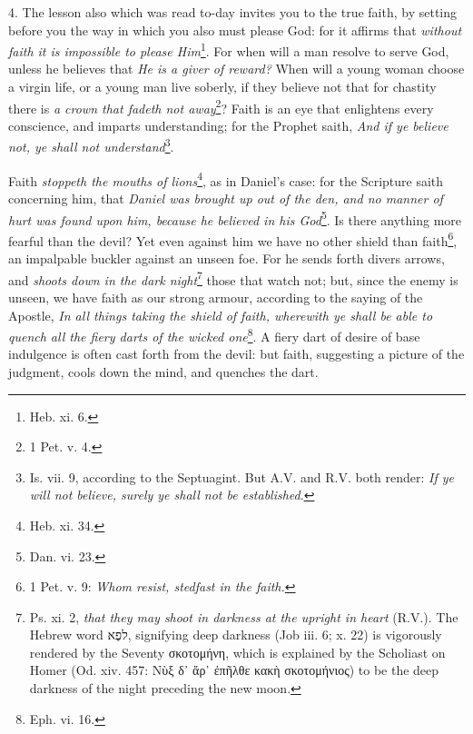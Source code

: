 4. The lesson also which was read to-day invites you to the true faith, by setting before you the way in which you also must please God: for it affirms that \emph{without faith it is impossible to please Him}\footnote{Heb. xi. 6.}. For when will a man resolve to serve God, unless he believes that \emph{He is a giver of reward?} When will a young woman choose a virgin life, or a young man live soberly, if they believe not that for chastity there is \emph{a crown that fadeth not away}\footnote{1 Pet. v. 4.}? Faith is an eye that enlightens every conscience, and imparts understanding; for the Prophet saith, \emph{And if ye believe not, ye shall not understand}\footnote{Is. vii. 9, according to the Septuagint. But A.V. and R.V. both render: \emph{If ye will not believe, surely ye shall not be established}.}.

Faith \emph{stoppeth the mouths of lions}\footnote{Heb. xi. 34.}, as in Daniel’s case: for the Scripture saith concerning him, that \emph{Daniel was brought up out of the den, and no manner of hurt was found upon him, because he believed in his God}\footnote{Dan. vi. 23.}. Is there anything more fearful than the devil? Yet even against him we have no other shield than faith\footnote{1 Pet. v. 9: \emph{Whom resist, stedfast in the faith.}}, an impalpable buckler against an unseen foe. For he sends forth divers arrows, and \emph{shoots down in the dark night}\footnote{Ps. xi. 2, \emph{that they may shoot in darkness at the upright in heart} (R.V.). The Hebrew word \texthebrew{ל\texthebrew{פֶא}}, signifying deep darkness (Job iii. 6; x. 22) is vigorously rendered by the Seventy \textgreek{σκοτομήνη}, which is explained by the Scholiast on Homer (Od. xiv. 457: \textgreek{Νὺξ δ᾽ ἄρ᾽ ἐπῆλθε κακὴ σκοτομήνιος}) to be the deep darkness of the night preceding the new moon.} those that watch not; but, since the enemy is unseen, we have faith as our strong armour, according to the saying of the Apostle, \emph{In all things taking the shield of faith, wherewith ye shall be able to quench all the fiery darts of the wicked one}\footnote{Eph. vi. 16.}. A fiery dart of desire of base indulgence is often cast forth from the devil: but faith, suggesting a picture of the judgment, cools down the mind, and quenches the dart.

